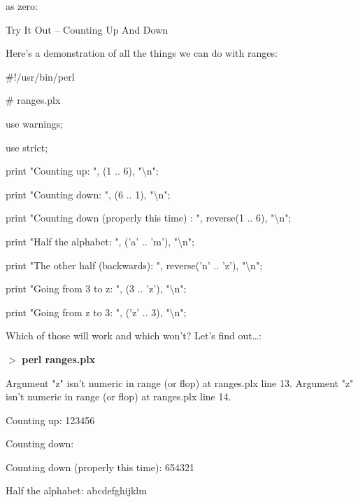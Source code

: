 \documentclass[a4paper,11pt]{book}
\begin{document}
\noindent as zero:

\noindent 

\noindent Try It Out -- Counting Up And Down

\noindent 

\noindent 

\noindent Here's a demonstration of all the things we can do with ranges:

\noindent 

\noindent 

\noindent \#!/usr/bin/perl

\noindent \# ranges.plx

\noindent use warnings;

\noindent use strict;

\noindent 

\noindent print "Counting up: ", (1 .. 6), "\textbackslash n";

\noindent print "Counting down: ", (6 .. 1), "\textbackslash n";

\noindent print "Counting down  (properly this time) : ", reverse(1 .. 6), "\textbackslash n";

\noindent 

\noindent print "Half the alphabet: ", ('a' .. 'm'), "\textbackslash n";

\noindent print "The other half (backwards): ", reverse('n' .. 'z'), "\textbackslash n";

\noindent 

\noindent print "Going from 3 to z: ", (3 .. 'z'), "\textbackslash n";

\noindent print "Going from z to 3: ", ('z' .. 3), "\textbackslash n";

\noindent 

\noindent 

\noindent Which of those will work and which won't? Let's find out\dots :

\noindent 

\noindent $>$ \textbf{perl ranges.plx}

\noindent Argument "z" isn't numeric in range (or flop) at ranges.plx line 13. Argument "z" isn't numeric in range (or flop) at ranges.plx line 14.

\noindent Counting up: 123456

\noindent Counting down:

\noindent Counting down  (properly this time): 654321

\noindent Half the alphabet: abcdefghijklm
\end{document}
